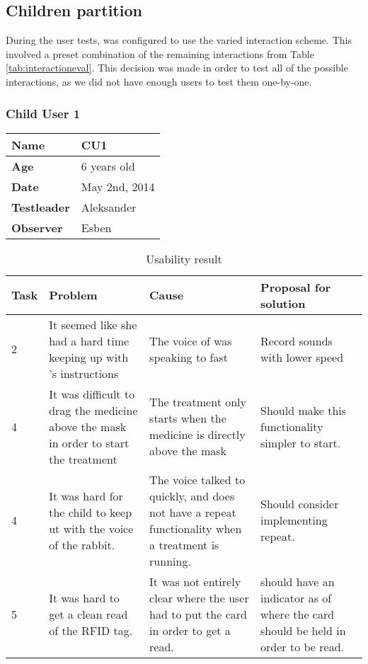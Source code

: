 \subsection{Children partition}

During the user tests, \ab{} was configured to use the varied interaction scheme. This involved a preset combination of the remaining interactions from Table \ref{tab:interactioneval}. This decision was made in order to test all of the possible interactions, as we did not have enough users to test them one-by-one. 

\subsubsection{Child User 1}
\begin{table}[H]
\begin{tabular}{| p{4.0cm} | p{4.0cm} |}
\hline
 \textbf{Name} & CU1 \\
 \hline
 \textbf{Age} & 6 years old \\
 \hline 
 \textbf{Date} & May 2nd, 2014 \\
 \hline
 \textbf{Testleader} & Aleksander \\
 \hline
 \textbf{Observer} & Esben \\
 \hline
\end{tabular}
\end{table}

\begin{table}[H]
\begin{tabular}{| p{3.0cm} | p{3.0cm} | p{3.0cm} | p{3.0cm} |}
\hline
	\textbf{Task} & \textbf{Problem} & \textbf{Cause} & \textbf{Proposal for solution} \\
	\hline
	2 & It seemed like she had a hard time keeping up with \ab{}'s instructions & The voice of \ab{} was speaking to fast & Record sounds with lower speed \\
	\hline
	4 & It was difficult to drag the medicine above the mask in order to start the treatment & The treatment only starts when the medicine is directly above the mask & Should make this functionality simpler to start.  \\
	\hline
	4 & It was hard for the child to keep ut with the voice of the rabbit. & The voice talked to quickly, and \app{} does not have a repeat functionality when a treatment is running. & Should consider implementing repeat.\\ 
	\hline
	5 & It was hard to get a clean read of the RFID tag. & It was not entirely clear where the user had to put the card in order to get a read. & \ab{} should have an indicator as of where the card should be held in order to be read.  \\
	\hline
\end{tabular}
\label{tab:test2}
\caption{Usability result}
\end{table}

